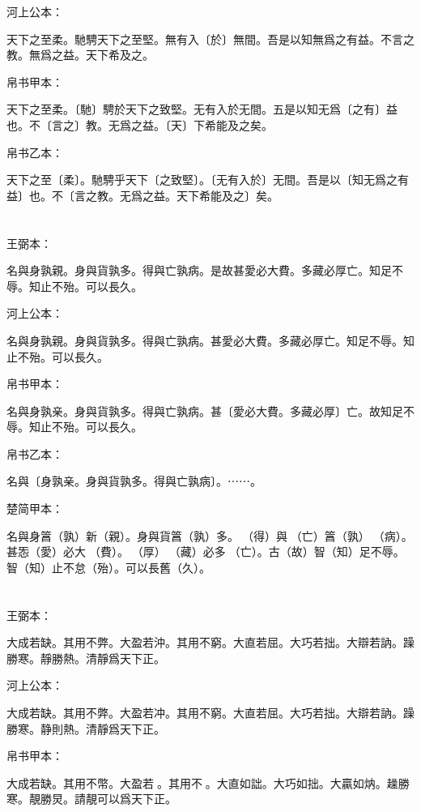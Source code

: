 \documentclass[a5paper]{ctexbook}
\begin{document}
    河上公本：

    天下之至柔。馳騁天下之至堅。無有入〔於〕無間。吾是以知無爲之有益。不言之教。無爲之益。天下希及之。

    帛书甲本：

    天下之至柔。〔馳〕騁於天下之致堅。无有入於无間。五是以知无爲〔之有〕益也。不〔言之〕教。无爲之益。〔天〕下希能及之矣。

    帛书乙本：

    天下之至〔柔〕。馳騁乎天下〔之致堅〕。〔无有入於〕无間。吾是以〔知无爲之有益〕也。不〔言之教。无爲之益。天下希能及之〕矣。

    \chapter{}
    王弼本：

    名與身孰親。身與貨孰多。得與亡孰病。是故甚愛必大費。多藏必厚亡。知足不辱。知止不殆。可以長久。

    河上公本：

    名與身孰親。身與貨孰多。得與亡孰病。甚愛必大費。多藏必厚亡。知足不辱。知止不殆。可以長久。

    帛书甲本：

    名與身孰亲。身與貨孰多。得與亡孰病。甚〔愛必大費。多藏必厚〕亡。故知足不辱。知止不殆。可以長久。

    帛书乙本：

    名與〔身孰亲。身與貨孰多。得與亡孰病〕。⋯⋯。

    楚简甲本：

    名與身䈞（孰）新（親）。身與貨䈞（孰）多。󰴼（得）與󶵔（亡）䈞（孰）󶓄（病）。甚㤅（愛）必大󶵖（費）。󶵗（厚）󶤖（藏）必多󶵔（亡）。古（故）智（知）足不辱。智（知）止不怠（殆）。可以長舊（久）。

    \chapter{}
    王弼本：

    大成若缺。其用不弊。大盈若沖。其用不窮。大直若屈。大巧若拙。大辯若訥。躁勝寒。靜勝熱。清靜爲天下正。

    河上公本：

    大成若缺。其用不弊。大盈若冲。其用不窮。大直若屈。大巧若拙。大辯若訥。躁勝寒。静則熱。清靜爲天下正。

    帛书甲本：

    大成若缺。其用不幣。大盈若𥁵。其用不𡩫。大直如詘。大巧如拙。大贏如㶧。趮勝寒。靚勝炅。請靚可以爲天下正。
\end{document}
